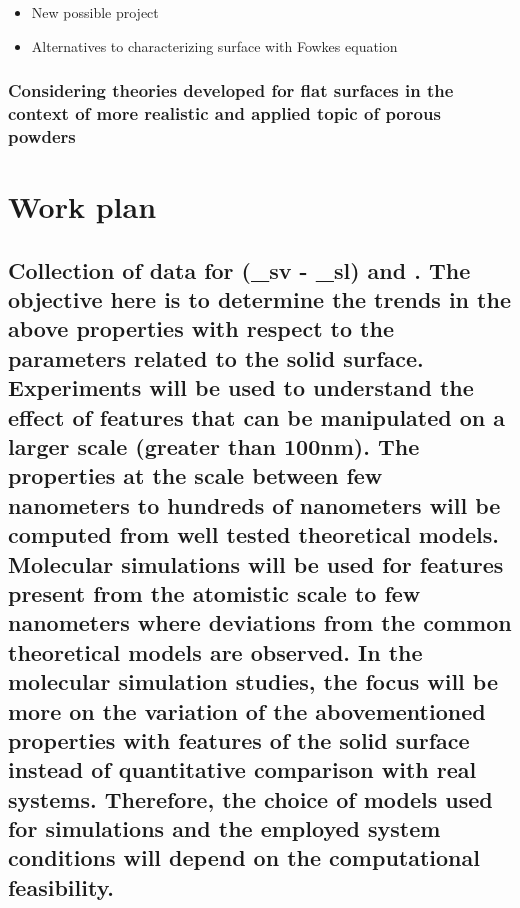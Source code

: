 \documentclass[a4paper,12pt,single,pdftex]{scrartcl}
\begin{document}
{\begin{itemize}
\label{ID_1602351942}\item New possible project
\label{ID_714004449}\item Alternatives to characterizing surface with Fowkes equation
\end{itemize}
\label{ID_1602351942}\label{ID_714004449}\label{ID_30899692}\subsubsection{Considering theories developed for flat surfaces in the context of more realistic and applied topic of porous powders}

\label{ID_1615838882}\section{Work plan}

\label{ID_392987275}\subsection{Collection of data for (\gamma_{sv} - \gamma_{sl}) and . The objective here is to determine the trends in the above properties with respect to the parameters related to the solid surface. Experiments will be used to understand the effect of features that can be manipulated on a larger scale (greater than 100nm). The properties at the scale between few nanometers to hundreds of nanometers will be computed from well tested theoretical models. Molecular simulations will be used for features present from the atomistic scale to few nanometers where deviations from the common theoretical models are observed. In the molecular simulation studies, the focus will be more on the variation of the abovementioned properties with features of the solid surface instead of quantitative comparison with real systems. Therefore, the choice of models used for simulations and the employed system conditions will depend on the computational feasibility.}

}
\end{document}
